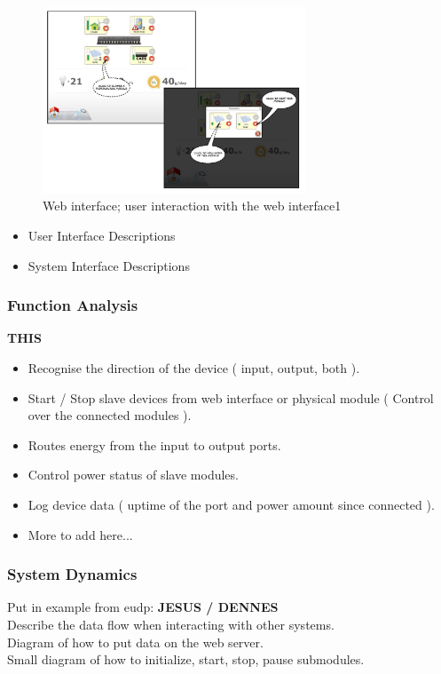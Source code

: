 		\begin{figure}[h!]		%
			\begin{centering}
				 \includegraphics[width=0.7\textwidth]{images/web_interface2.jpg}
				\caption{Web interface; user interaction with the web interface1}
		 	\end{centering}
		\end{figure}			
			
		\begin{itemize}
			\item User Interface Descriptions
				
			\item System Interface Descriptions
		\end{itemize}
	\subsubsection{Function Analysis}
	 \textbf{THIS}
		\begin{itemize}
			\item Recognise the direction of the device ( input, output, both ).
			\item Start / Stop slave devices from web interface or physical module ( Control over the connected modules ).
			\item Routes energy from the input to output ports.
			\item Control power status of slave modules.
			\item Log device data ( uptime of the port and power amount since connected ).
			\item More to add here...
		\end{itemize}
	\subsubsection{System Dynamics}
			Put in example from eudp: %
			 \textbf{JESUS / DENNES}
			\\Describe the data flow when interacting with other systems.
			\\Diagram of how to put data on the web server.
			\\Small diagram of how to initialize, start, stop, pause submodules.
